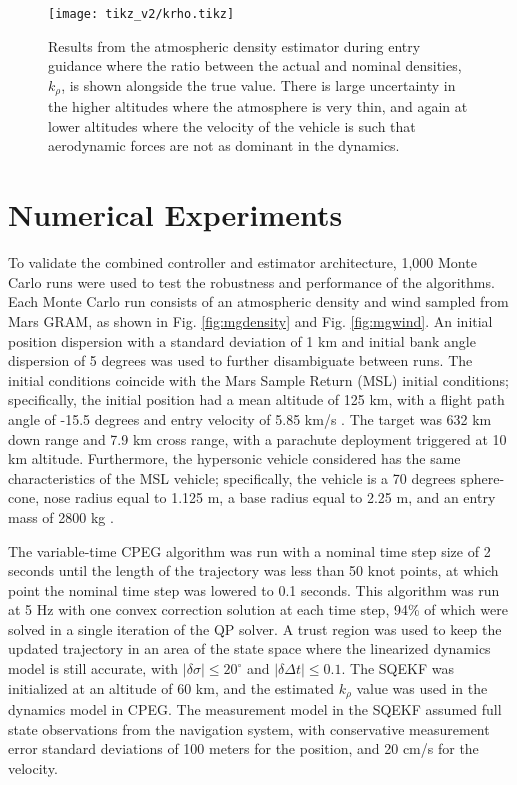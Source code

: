 \begin{figure}
    \centering
    \texttt{[image: tikz\_v2/krho.tikz]}
    \caption{Results from the atmospheric density estimator during entry guidance where the ratio between the actual and nominal densities, $k_\rho$, is shown alongside the true value. There is large uncertainty in the higher altitudes where the atmosphere is very thin, and again at lower altitudes where the velocity of the vehicle is such that aerodynamic forces are not as dominant in the dynamics.}
    \label{fig:krho}
\end{figure}

\section{Numerical Experiments}\label{section6}
To validate the combined controller and estimator architecture, 1,000 Monte Carlo runs were used to test the robustness and performance of the algorithms. Each Monte Carlo run consists of an atmospheric density and wind sampled from Mars GRAM, as shown in Fig. \ref{fig:mgdensity} and Fig. \ref{fig:mgwind}. An initial position dispersion with a standard deviation of 1 km and initial bank angle dispersion of 5 degrees was used to further disambiguate between runs. The initial conditions coincide with the Mars Sample Return (MSL) initial conditions; specifically, the initial position had a mean altitude of 125 km, with a flight path angle of -15.5 degrees and entry velocity of 5.85 km/s \cite{braun2006, steltzner2006}. The target was 632 km down range and 7.9 km cross range, with a parachute deployment triggered at 10 km altitude. Furthermore, the hypersonic vehicle considered has the same characteristics of the MSL vehicle; specifically, the vehicle is a 70 degrees sphere-cone, nose radius equal to 1.125 m, a base radius equal to 2.25 m, and an entry mass of 2800 kg \cite{braun2006}.

The variable-time CPEG algorithm was run with a nominal time step size of 2 seconds until the length of the trajectory was less than 50 knot points, at which point the nominal time step was lowered to 0.1 seconds. This algorithm was run at 5 Hz with one convex correction solution at each time step, 94\% of which were solved in a single iteration of the QP solver. A trust region was used to keep the updated trajectory in an area of the state space where the linearized dynamics model is still accurate, with $|\delta \sigma | \leq 20 ^\circ$ and $|\delta \Delta t |\leq 0.1 $. The SQEKF was initialized at an altitude of 60 km, and the estimated $k_\rho$ value was used in the dynamics model in CPEG. The measurement model in the SQEKF assumed full state observations from the navigation system, with conservative measurement error standard deviations of 100 meters for the position, and 20 cm/s for the velocity. 

